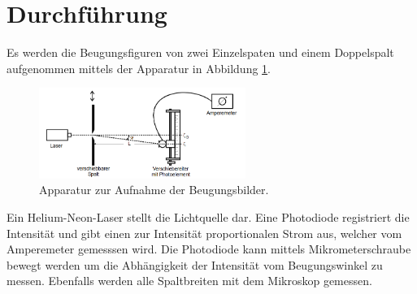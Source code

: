\section{Durchführung}
\label{sec:Durchführung}
Es werden die Beugungsfiguren von zwei Einzelspaten und einem Doppelspalt aufgenommen mittels der Apparatur
in Abbildung \ref{fig:aufbau}.
\begin{figure}
 \centering
 \includegraphics[width=0.6\textwidth]{aufbau.PNG}
 \caption{Apparatur zur Aufnahme der Beugungsbilder.}
 \label{fig:aufbau}
\end{figure}
Ein Helium-Neon-Laser stellt die Lichtquelle dar. Eine Photodiode registriert die Intensität und
gibt einen zur Intensität proportionalen Strom aus, welcher vom Amperemeter gemesssen wird.
Die Photodiode kann mittels Mikrometerschraube bewegt werden um die Abhängigkeit der Intensität vom Beugungswinkel
zu messen.
Ebenfalls werden alle Spaltbreiten mit dem Mikroskop gemessen.
